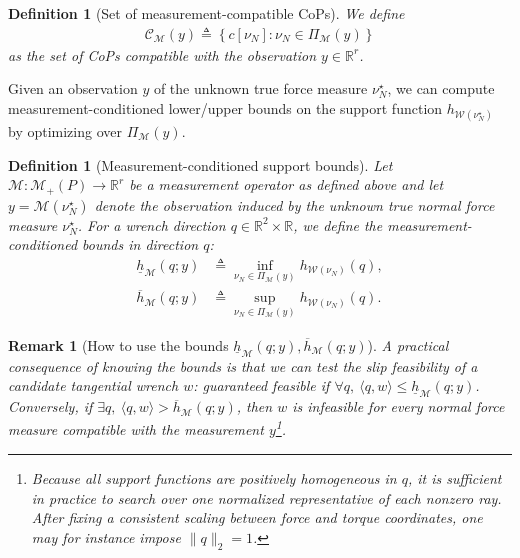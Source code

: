 \documentclass[11pt,a4paper]{article}
\theoremstyle{proposition}
\newtheorem{remark}[theorem]{Remark}
\newtheorem{definition}[theorem]{Definition}
\begin{document}
\begin{definition}[Set of measurement-compatible CoPs]\label{def:CM}
    We define
    \begin{align}
    \mathcal C_{\mathcal M}(y)
    \triangleq
    \left\{
    c[\nu_N]:
    \nu_N\in\Pi_{\mathcal M}(y)
    \right\}
    \end{align}
    as the set of CoPs compatible with the observation $y \in \mathbb{R}^r$.    
\end{definition}

Given an observation $y$ of the unknown true force measure $\nu_N^\star$, we can compute measurement-conditioned lower/upper bounds on the support function $h_{\mathcal W(\nu_N^\star)}$ by optimizing over $\Pi_{\mathcal M}(y)$. 

\begin{definition}[Measurement-conditioned support bounds]\label{def:measurement_support_bounds}
Let $\mathcal M:\mathcal M_+(P)\rightarrow\mathbb R^r$ be a measurement operator as defined above and let $y=\mathcal M(\nu_N^\star)$ denote the observation induced by the unknown true normal force measure $\nu_N^\star$. For a wrench direction $q\in\mathbb R^2\times\mathbb R$, we define the \textit{measurement-conditioned bounds in direction $q$}:
\begin{align}
    \label{eq:def_mea_bounds}
    \underline h_{\mathcal M}(q;y)
    &\triangleq
    \inf_{\nu_N\in\Pi_{\mathcal M}(y)}
    h_{\mathcal W(\nu_N)}(q),\\
    \overline h_{\mathcal M}(q;y)
    &\triangleq
    \sup_{\nu_N\in\Pi_{\mathcal M}(y)}
    h_{\mathcal W(\nu_N)}(q).
\end{align}
\end{definition}


\begin{remark}[How to use the bounds $\underline h_{\mathcal M}(q;y), \overline h_{\mathcal M}(q;y)$]
    A practical consequence of knowing the bounds is that we can test the slip feasibility of a candidate tangential wrench $w$: guaranteed feasible if $\forall q,~\langle q,w\rangle \le \underline h_{\mathcal M}(q;y)$.
    Conversely, if $\exists q,~\langle q,w\rangle >\overline h_{\mathcal M}(q;y)$, then $w$ is infeasible for every normal force measure compatible with the measurement $y$\footnote{Because all support functions are positively homogeneous in $q$, it is sufficient in practice to search over one normalized representative of each nonzero ray. After fixing a consistent scaling between force and torque coordinates, one may for instance impose $\|q\|_2=1$.}.
\end{remark}
\end{document}
